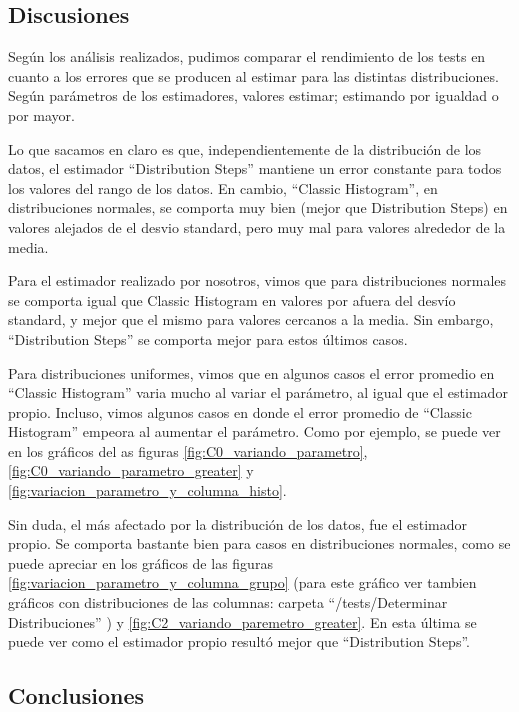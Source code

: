 	\subsection{Discusiones}	
	
	Seg\'un los an\'alisis realizados, pudimos comparar el rendimiento de los tests en cuanto a los errores que se producen al estimar para las distintas distribuciones. Seg\'un par\'ametros de los estimadores, valores estimar; estimando por igualdad o por mayor.
	
	Lo que sacamos en claro es que, independientemente de la distribuci\'on de los datos, el estimador ``Distribution Steps'' mantiene un error constante para todos los valores del rango de los datos. En cambio, ``Classic Histogram'', en distribuciones normales, se comporta muy bien (mejor que Distribution Steps) en valores alejados de el desvio standard, pero muy mal para valores alrededor de la media.
	
	Para el estimador realizado por nosotros, vimos que para distribuciones normales se comporta igual que Classic Histogram en valores por afuera del desv\'io standard, y mejor que el mismo para valores cercanos a la media. Sin embargo, ``Distribution Steps'' se comporta mejor para estos \'ultimos casos.
	
	Para distribuciones uniformes, vimos que en algunos casos el error promedio en ``Classic Histogram'' varia mucho al variar el par\'ametro, al igual que el estimador propio. Incluso, vimos algunos casos en donde el error promedio de ``Classic Histogram'' empeora al aumentar el par\'ametro. Como por ejemplo, se puede ver en los gr\'aficos del as figuras \ref{fig:C0_variando_parametro}, \ref{fig:C0_variando_parametro_greater} y \ref{fig:variacion_parametro_y_columna_histo}.
	
	Sin duda, el m\'as afectado por la distribuci\'on de los datos, fue el estimador propio. Se comporta bastante bien para casos en distribuciones normales, como se puede apreciar en los gr\'aficos de las figuras \ref{fig:variacion_parametro_y_columna_grupo} (para este gr\'afico ver tambien gr\'aficos con distribuciones de las columnas: carpeta ``/tests/Determinar Distribuciones'' ) y \ref{fig:C2_variando_paremetro_greater}. En esta \'ultima se puede ver como el estimador propio result\'o mejor que ``Distribution Steps''.
	
	\subsection{Conclusiones}
	
